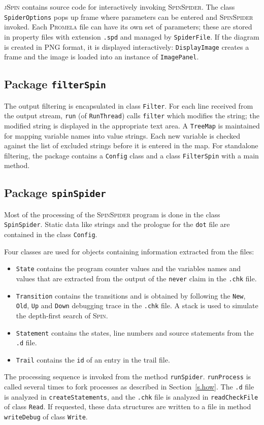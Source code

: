 \documentclass[11pt]{article}
\newcommand{\spn}{\textsc{Spin}}
\newcommand{\prm}{\textsc{Promela}}
\newcommand{\js}{\textsc{jSpin}}
\newcommand{\spd}{\textsc{SpinSpider}}
\newcommand{\dtf}{\texttt{dot}}
\newcommand{\p}[1]{\texttt{#1}}
\newcommand{\bu}[1]{\textsf{#1}}
\begin{document}
\js{} contains source code for interactively invoking \spd{}.
The class \p{SpiderOptions} pops up frame where parameters can be entered and
\spd{} invoked. Each \prm{} file can have its own set of parameters; these are stored
in property files with extension \p{.spd} and managed by \p{SpiderFile}. 
If the diagram is created in \bu{PNG} format, it is displayed interactively:
\p{DisplayImage} creates a frame and 
the image is loaded into an instance of \p{ImagePanel}.

\subsection{Package \p{filterSpin}}

The output filtering is encapsulated in class \p{Filter}.
For each line received from the output stream, \p{run}
(of \p{RunThread}) calls \p{filter}
which modifies the string; the modified string is displayed in the
appropriate text area.
A \p{TreeMap} is maintained for mapping variable names into value strings.
Each new variable is checked against the list of excluded strings before
it is entered in the map.
For standalone filtering, the package 
contains a \p{Config} class and a class \p{FilterSpin} with a main method.

\subsection{Package \p{spinSpider}}

Most of the processing of the \spd{} program is done 
in the class \p{SpinSpider}. 
Static data like strings and the prologue for the \dtf{} file are
contained in the class \p{Config}. 

Four classes are used for
objects containing information extracted from the files:
\begin{itemize}
\item \p{State} contains the program counter values and the variables names
and values that are extracted from the output of the \p{never} claim in the
\p{.chk} file.
\item \p{Transition} contains the transitions and is obtained by following
the \p{New}, \p{Old}, \p{Up} and \p{Down} debugging trace in the \p{.chk} file.
A stack is used to simulate the depth-first search of \spn{}.
\item \p{Statement} contains the states, line numbers and source statements
from the \p{.d} file.
\item \p{Trail} contains the \p{id} of an entry in the trail file.
\end{itemize}
The processing sequence is invoked from the method \p{runSpider}. 
\p{runProcess} is called several times to fork processes as described in
Section~\ref{s.how}. The \p{.d} file is analyzed in \p{createStatements},
and the \p{.chk} file is analyzed in \p{readCheckFile} of class \p{Read}.
If requested, these data structures are written to a file in method 
\p{writeDebug} of class \p{Write}.
\end{document}
